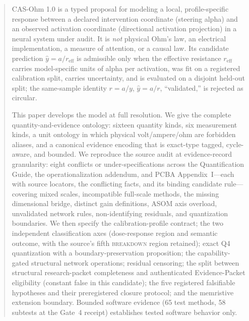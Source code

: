 \documentclass[11pt]{amsart}
\theoremstyle{definition}
\theoremstyle{remark}
\begin{document}
\begin{abstract}
CAS-Ohm 1.0 is a typed proposal for modeling a local, profile-specific response between a declared intervention coordinate (steering alpha) and an observed activation coordinate (directional activation projection) in a neural system under audit. It is \emph{not} physical Ohm's law, an electrical implementation, a measure of attention, or a causal law. Its candidate prediction $\hat y=a/r_{\mathrm{eff}}$ is admissible only when the effective resistance $r_{\mathrm{eff}}$ carries model-specific units of alpha per activation, was fit on a registered calibration split, carries uncertainty, and is evaluated on a disjoint held-out split; the same-sample identity $r=a/y$, $\hat y=a/r$, ``validated,'' is rejected as circular.

This paper develops the model at full resolution. We give the complete quantity-and-evidence ontology: sixteen quantity kinds, six measurement kinds, a unit ontology in which physical volt/ampere/ohm are forbidden aliases, and a canonical evidence encoding that is exact-type tagged, cycle-aware, and bounded. We reproduce the source audit at evidence-record granularity: eight conflicts or under-specifications across the Quantification Guide, the operationalization addendum, and PCBA Appendix~I---each with source locators, the conflicting facts, and its binding candidate rule---covering mixed scales, incompatible full-scale methods, the missing dimensional bridge, distinct gain definitions, ASOM axis overload, unvalidated network rules, non-identifying residuals, and quantization boundaries. We then specify the calibration-profile contract; the two independent classification axes (dose-response region and semantic outcome, with the source's fifth \textsc{breakdown} region retained); exact Q4 quantization with a boundary-preservation proposition; the capability-gated structural network operations; residual censoring; the split between structural research-packet completeness and authenticated Evidence-Packet eligibility (constant false in this candidate); the five registered falsifiable hypotheses and their preregistered closure protocol; and the memristive extension boundary. Bounded software evidence (65 test methods, 58 subtests at the Gate~4 receipt) establishes tested software behavior only.
\end{abstract}

\maketitle
\tableofcontents
\end{document}
